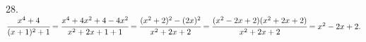 28. $\cfrac{x^4+4}{(x+1)^2+1}=\cfrac{x^4+4x^2+4-4x^2}{x^2+2x+1+1}=\cfrac{(x^2+2)^2-(2x)^2}{x^2+2x+2}=\cfrac{(x^2-2x+2)(x^2+2x+2)}{x^2+2x+2}=x^2-2x+2.$\\
